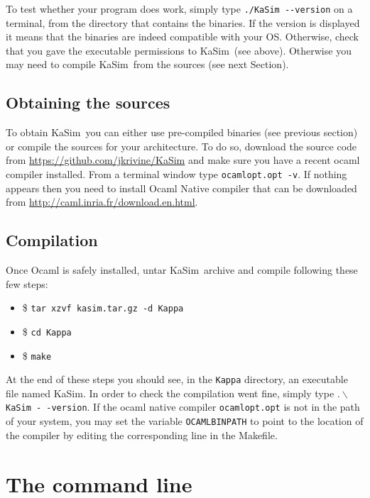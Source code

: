 \documentclass[11pt]{book}
\def\KaSim{\textsf{KaSim}}
\def\ttt#1{\texttt{#1}}
\def\bs{\backslash}
\def\ITE#1{\begin{itemize}#1\end{itemize}}
\def\dd{-\hspace{0.001cm}-}
\begin{document}
To test whether your program does work, simply type \ttt{./KaSim \dd version} on a terminal, from the directory that contains the binaries. If the version is displayed it means that the binaries are indeed compatible with your OS. Otherwise, check that you gave the executable permissions to \KaSim~(see above). Otherwise you may need to compile \KaSim~from the sources (see next Section).

\section{Obtaining the sources}
To obtain \KaSim~you can either use pre-compiled binaries (see previous section) or compile the sources for your architecture. To do so, download the source code from \url{https://github.com/jkrivine/KaSim} and make sure you have a recent ocaml compiler installed. From a terminal window type \ttt{ocamlopt.opt -v}. If nothing appears then you need to install Ocaml Native compiler that can be downloaded from \url{http://caml.inria.fr/download.en.html}. 

\section{Compilation}
Once Ocaml is safely installed, untar \KaSim~archive and compile following these few steps:
\ITE{
\item[\$]\ttt{tar xzvf kasim.tar.gz -d Kappa}
\item[\$]\ttt{cd Kappa}
\item[\$]\ttt{make}
}
At the end of these steps you should see, in the \ttt{Kappa} directory, an executable file named KaSim.  In order to check the compilation went fine, simply type $.\bs$\ttt{KaSim -\,-version}. If the ocaml native compiler \ttt{ocamlopt.opt} is not in the path of your system, you may set the variable \ttt{OCAMLBINPATH} to point to the location of the compiler by editing the corresponding line in the Makefile.

\chapter{The command line}\label{chap:cl}
\end{document}
